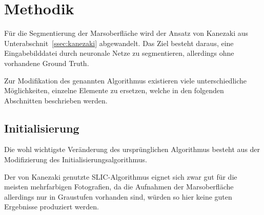\chapter{Methodik}
\label{chap:methodik}

Für die Segmentierung der Marsoberfläche wird der Ansatz von Kanezaki \etal \cite{kanezaki_18} aus Unterabschnit~\ref{ssec:kanezaki} abgewandelt. Das Ziel besteht daraus, eine Eingabebilddatei durch neuronale Netze zu segmentieren, allerdings ohne vorhandene Ground Truth.

Zur Modifikation des genannten Algorithmus existieren viele unterschiedliche Möglichkeiten, einzelne Elemente zu ersetzen, welche in den folgenden Abschnitten beschrieben werden.

\section{Initialisierung}
\label{sec:initialisierung}

Die wohl wichtigste Veränderung des ursprünglichen Algorithmus besteht aus der Modifizierung des Initialisierungsalgorithmus.

Der von Kanezaki \etal genutzte SLIC-Algorithmus eignet sich zwar gut für die meisten mehrfarbigen Fotografien, da die Aufnahmen der Marsoberfläche allerdings nur in Graustufen vorhanden sind, würden so hier keine guten Ergebnisse produziert werden.

